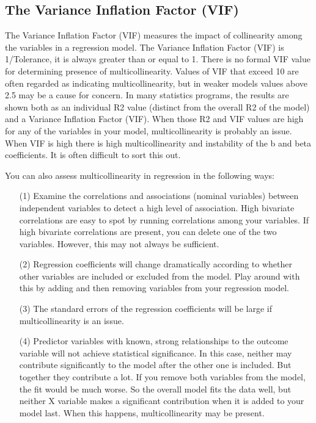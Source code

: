 \subsection{The Variance Inflation Factor (VIF)}



     The Variance Inflation Factor (VIF) measures the impact of collinearity among the variables in a regression model. The Variance Inflation Factor (VIF) is 1/Tolerance, it is always greater than or equal to 1. There is no formal VIF value for determining presence of multicollinearity. Values of VIF that exceed 10 are often regarded as indicating multicollinearity, but in weaker models values above 2.5 may be a cause for concern. In many statistics programs, the results are shown both as an individual R2 value (distinct from the overall R2 of the model) and a Variance Inflation Factor (VIF). When those R2 and VIF values are high for any of the variables in your model, multicollinearity is probably an issue. When VIF is high there is high multicollinearity and instability of the b and beta coefficients. It is often difficult to sort this out. \\

\bigskip

You can also assess multicollinearity in regression in the following ways:

\begin{itemize}
\item [(1)] Examine the correlations and associations (nominal variables) between independent variables to detect a high level of association. High bivariate correlations are easy to spot by running correlations among your variables. If high bivariate correlations are present, you can delete one of the two variables. However, this may not always be sufficient.

\item [(2)] Regression coefficients will change dramatically according to whether other variables are included or excluded from the model. Play around with this by adding and then removing variables from your regression model.

\item [(3)] The standard errors of the regression coefficients will be large if multicollinearity is an issue.

\item [(4)] Predictor variables with known, strong relationships to the outcome variable will not achieve statistical significance. In this case, neither may contribute significantly to the model after the other one is included. But together they contribute a lot. If you remove both variables from the model, the fit would be much worse. So the overall model fits the data well, but neither X variable makes a significant contribution when it is added to your model last. When this happens, multicollinearity may be present.

\end{itemize}

